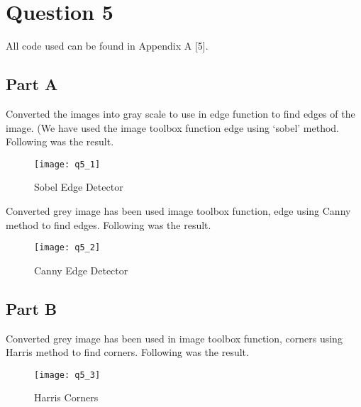 \newpage
\section{Question 5}
	\newline
	All code used can be found in Appendix A [5].
	\subsection{Part A}
	\newline
	Converted the images into gray scale to use in edge function to find edges of the image. (We have used the image toolbox function edge using ‘sobel’ method. Following was the result. \newline	
	\begin{figure}[position = here]
		\begin{centering}
			\texttt{[image: q5\_1]}\\
			\caption[\textit{RPYAxes}]{Sobel Edge Detector}
		\end{centering}
	\end{figure}
	\newline
	Converted grey image has been used image toolbox function, edge using Canny method to find edges. Following was the result.
	\newline	
	\begin{figure}[position = here]
		\begin{centering}
			\texttt{[image: q5\_2]}\\
			\caption[\textit{RPYAxes}]{Canny Edge Detector}
		\end{centering}
	\end{figure}
	\newline
	
	
	\pagebreak		
	\subsection{Part B}
	\newline
	Converted grey image has been used in image toolbox function, corners using Harris method to find corners. Following was the result.
	\newline	
	\begin{figure}[position = here]
		\begin{centering}
			\texttt{[image: q5\_3]}\\
			\caption[\textit{RPYAxes}]{Harris Corners}
		\end{centering}
	\end{figure}
	\newline
	
